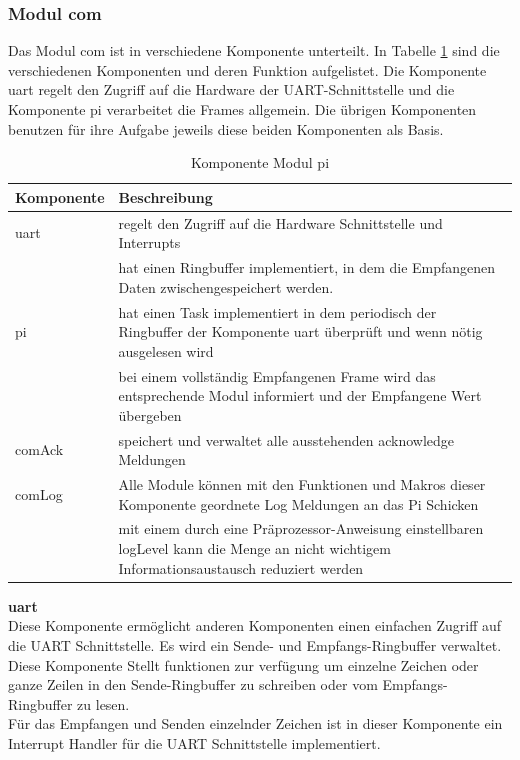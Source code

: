 \documentclass[../../main.tex]{subfiles}
\begin{document}
    \subsubsection{Modul com} \label{et_software_tiny_com}
    Das Modul com ist in verschiedene Komponente unterteilt. In Tabelle \ref{tab:et_mc_com} sind die verschiedenen Komponenten und deren Funktion aufgelistet. Die Komponente uart regelt den Zugriff auf die Hardware der UART-Schnittstelle und die Komponente pi verarbeitet die Frames allgemein. Die übrigen Komponenten benutzen für ihre Aufgabe jeweils diese beiden Komponenten als Basis.

    \begin{table}[H]
        \centering
        \begin{tabular}{|l|p{12cm}|}
        \hline
        \textbf{Komponente} & \textbf{Beschreibung}    \\ \hline
        uart  & regelt den Zugriff auf die Hardware Schnittstelle und Interrupts \\ & hat einen Ringbuffer implementiert, in dem die Empfangenen Daten zwischengespeichert werden.\\ \hline
        pi    & hat einen Task implementiert in dem periodisch der Ringbuffer der Komponente uart überprüft und wenn nötig ausgelesen wird \\ & bei einem vollständig Empfangenen Frame wird das entsprechende Modul informiert und der Empfangene Wert übergeben \\ \hline
        comAck & speichert und verwaltet alle ausstehenden acknowledge Meldungen \\ \hline
        comLog & Alle Module können mit den Funktionen und Makros dieser Komponente geordnete Log Meldungen an das Pi Schicken \\ & mit einem durch eine Präprozessor-Anweisung einstellbaren logLevel kann die Menge an nicht wichtigem Informationsaustausch reduziert werden \\ \hline
        \end{tabular}
        \caption{Komponente Modul pi}
        \label{tab:et_mc_com}
    \end{table}

    \textbf{uart}\\
    Diese Komponente ermöglicht anderen Komponenten einen einfachen Zugriff auf die UART Schnittstelle. Es wird ein Sende- und Empfangs-Ringbuffer verwaltet. Diese Komponente Stellt funktionen zur verfügung um einzelne Zeichen oder ganze Zeilen in den Sende-Ringbuffer zu schreiben oder vom Empfangs-Ringbuffer zu lesen.\\
    Für das Empfangen und Senden einzelnder Zeichen ist in dieser Komponente ein Interrupt Handler für die UART Schnittstelle implementiert.\\
\end{document}
